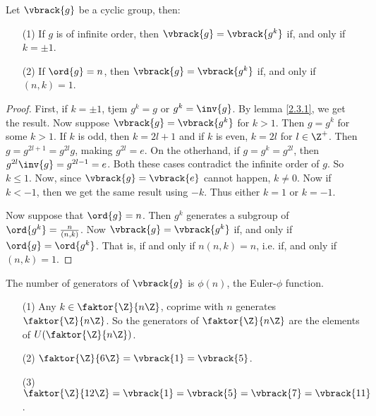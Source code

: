 \begin{lemma}\label{2.3.7}
    Let $\vbrack{g}$ be a cyclic group, then:
    \begin{enumerate}
        \item[(1)] If $g$ is of infinite order, then  $\vbrack{g}=\vbrack{g^k}$
            if, and only if $k=\pm 1$.

        \item [(2)] If $\ord{g}=n$, then $\vbrack{g}=\vbrack{g^k}$ if, and only
            if $(n,k)=1$.
    \end{enumerate}
\end{lemma}
\begin{proof}
    First, if $k=\pm 1$, tjem  $g^k=g$ or  $g^k=\inv{g}$. By lemma \ref{2.3.1},
    we get the result. Now suppose $\vbrack{g}=\vbrack{g^k}$ for $k>1$. Then
    $g=g^k$ for some  $k>1$. If  $k$ is odd, then  $k=2l+1$ and if  $k$ is even,
     $k=2l$ for  $l \in \Z^+$. Then  $g=g^{2l+1}=g^{2l}g$, making $g^{2l}=e$. On
     the otherhand, if $g=g^k=g^{2l}$, then $g^{2l}\inv{g}=g^{2l-1}=e$. Both
     these cases contradict the infinite order of $g$. So  $k \leq 1$. Now,
     since  $\vbrack{g}=\vbrack{e}$ cannot happen, $k \neq 0$. Now if $k<-1$,
     then we get the same result using  $-k$. Thus either  $k=1$ or  $k=-1$.

     Now suppose that  $\ord{g}=n$. Then $g^k$ generates a subgroup of
     $\ord{g^k}=\frac{n}{(n,k)}$. Now $\vbrack{g}=\vbrack{g^k}$ if, and only if
     $\ord{g}=\ord{g^k}$. That is, if and only if  $n(n,k)=n$, i.e. if, and only
     if $(n,k)=1$.
\end{proof}
\begin{corollary}
    The number of generators of $\vbrack{g}$ is $\phi(n)$, the Euler-$\phi$
    function.
\end{corollary}

\begin{example}
    \begin{enumerate}
        \item[(1)] Any $k \in \faktor{\Z}{n\Z}$, coprime with $n$ generates
            $\faktor{\Z}{n\Z}$. So the generators of $\faktor{\Z}{n\Z}$ are the
            elements of $U(\faktor{\Z}{n\Z})$.

        \item[(2)] $\faktor{\Z}{6\Z}=\vbrack{1}=\vbrack{5}$.

        \item[(3)]
            $\faktor{\Z}{12\Z}=\vbrack{1}=\vbrack{5}=\vbrack{7}=\vbrack{11}$.
    \end{enumerate}
\end{example}

